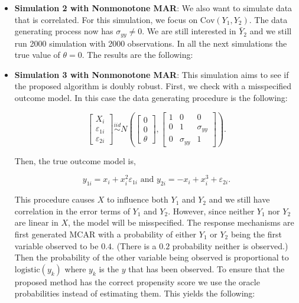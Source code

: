 \documentclass[12pt]{article}
\newcommand{\Cov}{{\text{Cov}}}
\newcommand{\logistic}{{\text{logistic}}}
\begin{document}
\begin{itemize}
    
    
    

    \newpage
    
    \item \textbf{Simulation 2 with Nonmonotone MAR}:
    We also want to simulate data that is correlated. For this simulation, we
    focus on $\Cov(Y_1, Y_2)$. The data generating process now has $\sigma_{yy}
    \neq 0$. We are still interested in $\bar Y_2$ and we still run 2000
    simulation with 2000 observations. In all the next simulations the true
    value of $\theta = 0$. The results are the following:

    
    
    

    \newpage

  \item \textbf{Simulation 3 with Nonmonotone MAR}:
    This simulation aims to see if the proposed algorithm is doubly robust.
    First, we check with a misspecified outcome model. In this case the data
    generating procedure is the following:

    \[\begin{bmatrix}
    X_i \\ \varepsilon_{1i} \\ \varepsilon_{2i}
    \end{bmatrix} \stackrel{iid}{\sim}
    N\left(
    \begin{bmatrix}
        0 \\ 0 \\ \theta
    \end{bmatrix},
    \begin{bmatrix}
        1 & 0 & 0 \\
        0 & 1 & \sigma_{yy}\\
        0 & \sigma_{yy} & 1
    \end{bmatrix}
    \right).\]

    Then, the true outcome model is,

    \[y_{1i} = x_i + x_i^2 \varepsilon_{1i} \text{ and } 
    y_{2i} = -x_i + x_i^3 + \varepsilon_{2i}.\]

    This procedure causes $X$ to influence both $Y_1$ and $Y_2$ and we still
    have correlation in the error terms of $Y_1$ and $Y_2$. However, since
    neither $Y_1$ nor $Y_2$ are linear in $X$, the model will be misspecified.
    The response mechanisms are first generated MCAR with a probability of
    either $Y_1$ or $Y_2$ being the first variable observed to be $0.4$. (There
    is a $0.2$ probability neither is observed.) Then the probability of the
    other variable being observed is proportional to $\logistic(y_k)$ where
    $y_k$ is the $y$ that has been observed. To ensure that the proposed method
    has the correct propensity score we use the oracle probabilities instead of
    estimating them. This yields the following:


\end{itemize}
\end{document}
